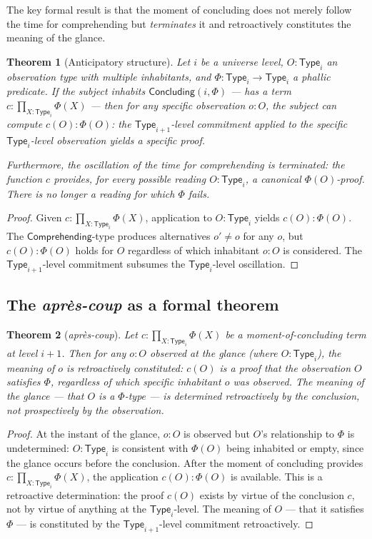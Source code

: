 \documentclass[12pt]{article}
\newtheorem{theorem}{Theorem}
\theoremstyle{definition}
\theoremstyle{remark}
\newcommand{\Type}[1]{\mathsf{Type}_{#1}}
\newcommand{\aprescoup}{\textit{apr\`es-coup}}
\begin{document}
The key formal result is that the moment of concluding does not merely follow the time for comprehending but \emph{terminates} it and retroactively constitutes the meaning of the glance.

\begin{theorem}[Anticipatory structure]
Let $i$ be a universe level, $O : \Type{i}$ an observation type with multiple inhabitants, and $\Phi : \Type{i} \to \Type{i}$ a phallic predicate. If the subject inhabits $\mathsf{Concluding}(i, \Phi)$ --- has a term $c : \prod_{X:\Type{i}} \Phi(X)$ --- then for any specific observation $o : O$, the subject can compute $c(O) : \Phi(O)$: the $\Type{i+1}$-level commitment applied to the specific $\Type{i}$-level observation yields a specific proof.

Furthermore, the oscillation of the time for comprehending is terminated: the function $c$ provides, for every possible reading $O : \Type{i}$, a canonical $\Phi(O)$-proof. There is no longer a reading for which $\Phi$ fails.
\end{theorem}

\begin{proof}
Given $c : \prod_{X:\Type{i}} \Phi(X)$, application to $O : \Type{i}$ yields $c(O) : \Phi(O)$. The $\mathsf{Comprehending}$-type produces alternatives $o' \neq o$ for any $o$, but $c(O) : \Phi(O)$ holds for $O$ regardless of which inhabitant $o : O$ is considered. The $\Type{i+1}$-level commitment subsumes the $\Type{i}$-level oscillation.
\end{proof}

\subsection{The \aprescoup{} as a formal theorem}

\begin{theorem}[\aprescoup{}]
Let $c : \prod_{X:\Type{i}} \Phi(X)$ be a moment-of-concluding term at level $i+1$. Then for any $o : O$ observed at the glance (where $O : \Type{i}$), the meaning of $o$ is retroactively constituted: $c(O)$ is a proof that the observation $O$ satisfies $\Phi$, regardless of which specific inhabitant $o$ was observed. The meaning of the glance --- that $O$ is a $\Phi$-type --- is determined retroactively by the conclusion, not prospectively by the observation.
\end{theorem}

\begin{proof}
At the instant of the glance, $o : O$ is observed but $O$'s relationship to $\Phi$ is undetermined: $O : \Type{i}$ is consistent with $\Phi(O)$ being inhabited or empty, since the glance occurs before the conclusion. After the moment of concluding provides $c : \prod_{X:\Type{i}} \Phi(X)$, the application $c(O) : \Phi(O)$ is available. This is a retroactive determination: the proof $c(O)$ exists by virtue of the conclusion $c$, not by virtue of anything at the $\Type{i}$-level. The meaning of $O$ --- that it satisfies $\Phi$ --- is constituted by the $\Type{i+1}$-level commitment retroactively.
\end{proof}
\end{document}
